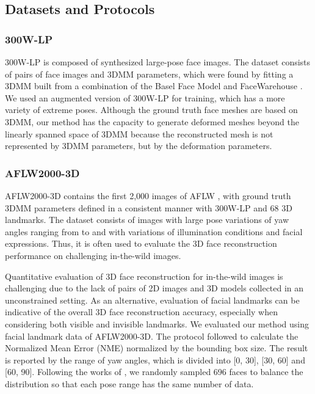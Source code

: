 \documentclass[letterpaper, 10 pt, conference]{ieeeconf}
\begin{document}
\subsection{Datasets and Protocols}
\subsubsection{300W-LP}
300W-LP \cite{zhu2016face} is composed of synthesized large-pose face images. The dataset consists of pairs of face images and 3DMM parameters, which were found by fitting a 3DMM built from a combination of the Basel Face Model \cite{paysan20093d} and FaceWarehouse \cite{cao2013facewarehouse}. 
We used an augmented version of 300W-LP \cite{3ddfa_cleardusk} for training, which has a more variety of extreme poses. Although the ground truth face meshes are based on 3DMM, our method has the capacity to generate deformed meshes beyond the linearly spanned space of 3DMM because the reconstructed mesh is not represented by 3DMM parameters, but by the deformation parameters.

\subsubsection{AFLW2000-3D}
AFLW2000-3D \cite{zhu2016face} contains the first 2,000 images of AFLW \cite{koestinger2011annotated}, with ground truth 3DMM parameters defined in a consistent manner with 300W-LP \cite{zhu2016face} and 68 3D landmarks. The dataset consists of images with large pose variations of yaw angles ranging from  to  and with variations of illumination conditions and facial expressions. Thus, it is often used to evaluate the 3D face reconstruction performance on challenging in-the-wild images.

Quantitative evaluation of 3D face reconstruction for in-the-wild images is challenging due to the lack of pairs of 2D images and 3D models collected in an unconstrained setting. As an alternative, evaluation of facial landmarks can be indicative of the overall 3D face reconstruction accuracy, especially when considering both visible and invisible landmarks. 
We evaluated our method using facial landmark data of AFLW2000-3D. The protocol followed \cite{feng2018joint,guo2020towards,zhu2016face} to calculate the Normalized Mean Error (NME) normalized by the bounding box size. The result is reported by the range of yaw angles, which is divided into [0\degree, 30\degree], [30\degree, 60\degree] and [60\degree, 90\degree]. Following the works of \cite{feng2018joint,zhu2016face}, we randomly sampled 696 faces to balance the distribution so that each pose range has the same number of data.
\end{document}
